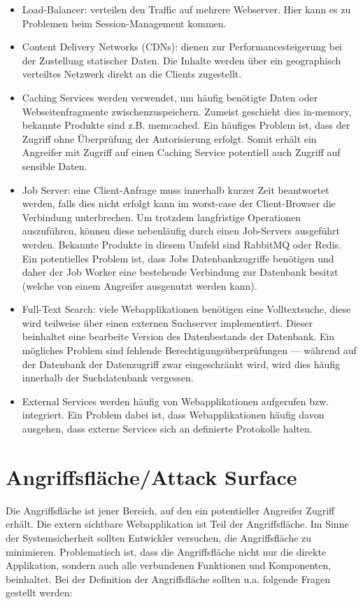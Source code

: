\begin{itemize}
	\item Load-Balancer: verteilen den Traffic auf mehrere Webserver. Hier kann es zu Problemen beim Session-Management kommen.
	\item Content Delivery Networks (CDNs): dienen zur Performancesteigerung bei der Zustellung statischer Daten. Die Inhalte werden über ein geographisch verteiltes Netzwerk direkt an die Clients zugestellt.
	\item Caching Services werden verwendet, um häufig benötigte Daten oder Webseitenfragmente zwischenzuspeichern. Zumeist geschieht dies in-memory, bekannte Produkte sind z.B. memcached. Ein häufiges Problem ist, dass der Zugriff ohne Überprüfung der Autorisierung erfolgt. Somit erhält ein Angreifer mit Zugriff auf einen Caching Service potentiell auch Zugriff auf sensible Daten.
	\item Job Server: eine Client-Anfrage muss innerhalb kurzer Zeit beantwortet werden, falls dies nicht erfolgt kann im worst-case der Client-Browser die Verbindung unterbrechen. Um trotzdem langfristige Operationen auszuführen, können diese nebenläufig durch einen Job-Servers ausgeführt werden. Bekannte Produkte in diesem Umfeld sind RabbitMQ oder Redis. Ein potentielles Problem ist, dass Jobs Datenbankzugriffe benötigen und daher der Job Worker eine bestehende Verbindung zur Datenbank besitzt (welche von einem Angreifer ausgenutzt werden kann).
	\item Full-Text Search: viele Webapplikationen benötigen eine Volltextsuche, diese wird teilweise über einen externen Suchserver implementiert. Dieser beinhaltet eine bearbeite Version des Datenbestands der Datenbank. Ein mögliches Problem sind fehlende Berechtigungsüberprüfungen --- während auf der Datenbank der Datenzugriff zwar eingeschränkt wird, wird dies häufig innerhalb der Suchdatenbank vergessen.
	\item External Services werden häufig von Webapplikationen aufgerufen bzw. integriert. Ein Problem dabei ist, dass Webapplikationen häufig davon ausgehen, dass externe Services sich an definierte Protokolle halten.
\end{itemize}

\section{Angriffsfläche/Attack Surface}

Die Angriffsfläche ist jener Bereich, auf den ein potentieller Angreifer Zugriff erhält. Die extern sichtbare Webapplikation ist Teil der Angriffsfläche. Im Sinne der Systemsicherheit sollten Entwickler versuchen, die Angriffsfläche zu minimieren. Problematisch ist, dass die Angriffsfläche nicht nur die direkte Applikation, sondern auch alle verbundenen Funktionen und Komponenten, beinhaltet. Bei der Definition der Angriffsfläche sollten u.a. folgende Fragen gestellt werden: 

